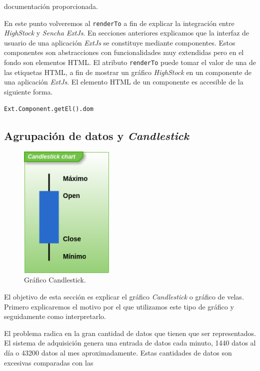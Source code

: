 	documentación proporcionada\cite{HighStockDoc}.
	\par
	En este punto volveremos al \texttt{renderTo} a fin de explicar la integración entre \emph{HighStock} y \emph{Sencha ExtJs}. En secciones anteriores
	explicamos que la interfaz de usuario de una aplicación \emph{ExtJs} se constituye mediante componentes. Estos componentes son abstracciones con
	funcionalidades muy extendidas pero en el fondo son elementos HTML. El atributo \texttt{renderTo} puede tomar el valor de una de las etiquetas
	HTML, a fin de mostrar un gráfico \emph{HighStock} en un componente de una aplicación \emph{ExtJs}. El elemento HTML de un componente es accesible de la
	siguiente forma.
    		\begin{center} \texttt{Ext.Component.getEl().dom}  \end{center}
	\subsection{Agrupación de datos y \emph{Candlestick}} 
		\begin{figure}
			\centering
	        	\includegraphics[keepaspectratio, width=0.40\textwidth]{./img/candlestick.png}
			\caption{Gráfico Candlestick.}
			\label{fig:candlestick}
		\end{figure}
		El objetivo de esta sección es explicar el gráfico \emph{Candlestick} o gráfico de velas. Primero explicaremos el motivo por el que
		utilizamos este tipo de gráfico y seguidamente como interpretarlo.
		\par
		El problema radica en la gran cantidad de datos que tienen que ser representados. El sistema de adquisición genera una entrada de
		datos cada minuto, 1440 datos al día o 43200 datos al mes aproximadamente. Estas cantidades de datos son excesivas comparadas con las
